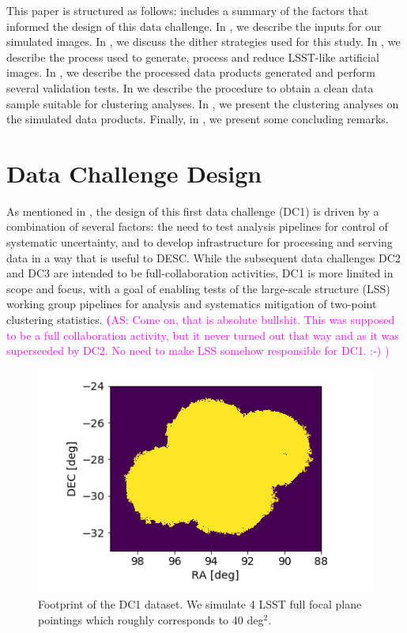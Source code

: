\documentclass[twocolumn]{aastex62}
\newcommand{\as}[1]{{\textcolor{magenta}{{\textbf (AS: #1)}}}}
\begin{document}
This paper is structured as follows:  includes a summary of the factors that informed
the design of this data challenge.  In , we describe the inputs for our simulated images. In , we discuss the dither strategies used for this study. In , we describe the process used to generate, process and reduce LSST-like artificial images. In , we describe the processed data products generated and perform several validation tests. In  we describe the procedure to obtain a clean data sample suitable for clustering analyses. In , we present the clustering analyses on the simulated data products. Finally, in , we present some concluding remarks.

\section{Data Challenge Design}
\label{sec:design}

As mentioned in , the design of this first data challenge (DC1) is driven by a
combination of several factors: the need to test analysis pipelines for control of systematic
uncertainty, and to develop infrastructure for processing and serving data in a way that is useful
to DESC.  While the subsequent data challenges DC2 and DC3 are intended to be full-collaboration activities, DC1 is more limited in
scope and focus, with a goal of enabling tests of the large-scale structure (LSS) working group
pipelines for analysis and systematics mitigation of two-point clustering statistics.
\as{Come on, that is absolute bullshit. This was supposed to be a full
  collaboration activity, but it never turned out that way and as it
  was superseeded by DC2. No need to make LSS somehow responsible for
  DC1. :-) }
\begin{figure}
\centering
\includegraphics[width=0.9\columnwidth]{footprint.png}
\caption{Footprint of the DC1 dataset. We simulate 4 LSST full focal plane pointings which roughly corresponds to 40 deg$^{2}$.}
\label{fig:footprint}
\end{figure}
\end{document}
